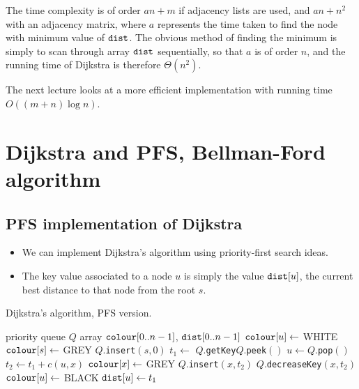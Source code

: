 The time complexity is of order $a n + m$ if adjacency lists are used,
and $a n + n^2$ with an adjacency matrix, where $a$ represents the time
taken to find the node with minimum value of $\dist$. 
The obvious method of finding the minimum is simply to scan through array $\dist$
sequentially, so that $a$ is of order $n$, and the running time of
Dijkstra is therefore $\Theta(n^2)$. 

The next lecture looks at a more efficient implementation with running time $O((m+n)\log n)$.

\chapter{Dijkstra and PFS, Bellman-Ford algorithm} %

\section{PFS implementation of Dijkstra}
\begin{itemize}
  \item We can implement Dijkstra's algorithm using priority-first search ideas. 
  \item The key value associated to a node $u$ is simply the value $\operatorname{\text{\texttt{dist}}}[u]$,
  the current best distance to that node from the root $s$.
\end{itemize}

\begin{algorithm}[H]
  \caption{Dijkstra's algorithm, PFS version.}
  \label{alg:dijkstra2}
\begin{algorithmic}[1]
	\State priority queue $Q$
	\State array $\operatorname{\text{\texttt{colour}}}[0..n-1]$, $\operatorname{\text{\texttt{dist}}}[0..n-1]$
		\State $\operatorname{\text{\texttt{colour}}}[u] \gets$ WHITE 
	\EndFor
	\State $\operatorname{\text{\texttt{colour}}}[s] \gets $ GREY
	\State $Q$.\texttt{insert}$(s, 0)$
		\State $t_1 \gets$  $Q$.\texttt{getKey}$Q$.\texttt{peek}$()$
		\State $u \gets Q$.\texttt{pop}$()$
			\State $t_2 \gets t_1 + c(u, x)$
				\State $\operatorname{\text{\texttt{colour}}}[x] \gets $ GREY
				\State $Q$.\texttt{insert}$(x, t_2)$
				\State $Q$.\texttt{decreaseKey}$(x, t_2)$
			\EndIf
		\EndFor
		\State $\operatorname{\text{\texttt{colour}}}[u] \gets $ BLACK
		\State $\operatorname{\text{\texttt{dist}}}[u] \gets t_1$ 
	\EndWhile
	\State \Return{$\dist$}
\EndFunction
\end{algorithmic}
\end{algorithm}


